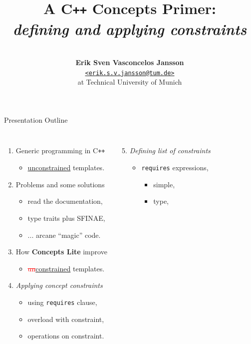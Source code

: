 \documentclass{beamer}
\title{\Large{\textbf{A C\texttt{++} Concepts Primer:}}\\
       \large{\emph{defining and applying constraints}}}
\author{\vspace{2ex}\\
        \textbf{Erik Sven Vasconcelos Jansson}\\
        {\href{mailto:erik.s.v.jansson@tum.de}
        {\texttt{<erik.s.v.jansson@tum.de>}}} \\
        {at Technical University of Munich}}
\begin{document}
    \frame{\titlepage}
    \begin{frame}[fragile]{Presentation Outline}
        \begin{columns}
            \begin{enumerate}
                \item Generic programming in C\texttt{++} \begin{itemize}
                    \item{\underline{unconstrained} templates.}
                \end{itemize}
                \item Problems and some solutions \begin{itemize}
                    \item{read the documentation,}
                    \item{type traits plus SFINAE,}
                    \item{... arcane ``magic'' code.}
                \end{itemize}
                \item How \textbf{Concepts Lite} improve \begin{itemize}
                    \item{\textcolor{red}{\st{un}}\underline{constrained} templates.}
                \end{itemize}
            \item \emph{Applying concept constraints} \begin{itemize}
                    \item using \texttt{requires} clause,
                    \item overload with constraint,
                    \item operations on constraint.
                \end{itemize}
            \end{enumerate}
            \begin{enumerate}
                \setcounter{enumi}{4}
                \item \emph{Defining list of constraints} \begin{itemize}
                    \item \texttt{requires} expressions, \begin{itemize}
                        \item simple,
                        \item type,

\end{itemize}
\end{itemize}
\end{enumerate}
\end{columns}
\end{frame}
\end{document}
